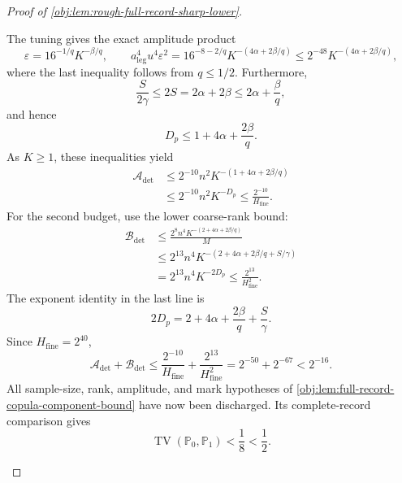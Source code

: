 \documentclass[11pt]{article}
\begin{document}
\begin{proof}[Proof of \cref{obj:lem:rough-full-record-sharp-lower}]
\begin{enumerate}
The tuning gives the exact amplitude product
\[
\varepsilon=16^{-1/q}K^{-\beta/q},
\qquad
a_{\mathrm{leg}}^4u^4\varepsilon^2
=
16^{-8-2/q}K^{-(4\alpha+2\beta/q)}
\le
2^{-48}K^{-(4\alpha+2\beta/q)},
\]
where the last inequality follows from \(q\le1/2\).
Furthermore,
\[
\frac{S}{2\gamma}\le2S
=2\alpha+2\beta
\le2\alpha+\frac{\beta}{q},
\]
and hence
\[
D_p\le1+4\alpha+\frac{2\beta}{q}.
\]
As \(K\ge1\), these inequalities yield
\[
\begin{aligned}
\mathcal A_{\mathrm{det}}
&\le
2^{-10}n^2K^{-(1+4\alpha+2\beta/q)}\\
&\le2^{-10}n^2K^{-D_p}
\le\frac{2^{-10}}{H_{\mathrm{fine}}}.
\end{aligned}
\]
For the second budget, use the lower coarse-rank bound:
\[
\begin{aligned}
\mathcal B_{\mathrm{det}}
&\le
\frac{2^8n^4K^{-(2+4\alpha+2\beta/q)}}{M}\\
&\le
2^{13}n^4
K^{-(2+4\alpha+2\beta/q+S/\gamma)}\\
&=
2^{13}n^4K^{-2D_p}
\le\frac{2^{13}}{H_{\mathrm{fine}}^2}.
\end{aligned}
\]
The exponent identity in the last line is
\[
2D_p=2+4\alpha+\frac{2\beta}{q}+\frac{S}{\gamma}.
\]
Since \(H_{\mathrm{fine}}=2^{40}\),
\[
\mathcal A_{\mathrm{det}}+\mathcal B_{\mathrm{det}}
\le
\frac{2^{-10}}{H_{\mathrm{fine}}}
+\frac{2^{13}}{H_{\mathrm{fine}}^2}
=
2^{-50}+2^{-67}<2^{-16}.
\]
All sample-size, rank, amplitude, and mark hypotheses of
\cref{obj:lem:full-record-copula-component-bound} have now been discharged. Its complete-record comparison gives
\[
\operatorname{TV}(\mathbb P_0,\mathbb P_1)
<\frac18<\frac12.
\]


\end{enumerate}
\end{proof}
\end{document}
